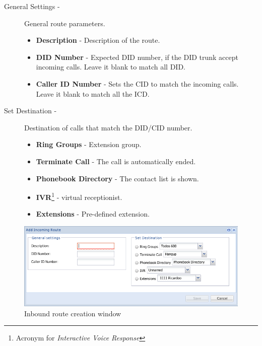 \begin{description}
            \item[General Settings -] General route parameters.
                \begin{itemize}
                    \item \textbf{Description} - Description of the route.
                    \item \textbf{DID Number} - Expected DID number, if the DID trunk accept incoming calls. Leave it blank to match all DID.
                    \item \textbf{Caller ID Number} - Sets the CID to match the incoming calls. Leave it blank to match all the ICD.
                \end{itemize}

            \item[Set Destination -] Destination of calls that match the DID/CID number.
                \begin{itemize}
                    \item \textbf{Ring Groups} - Extension group.
                    \item \textbf{Terminate Call} - The call is automatically ended.
                    \item \textbf{Phonebook Directory} - The contact list is shown.
                    \item \textbf{IVR}\footnote{Acronym for \emph{Interactive Voice Response}} - virtual receptionist.
                    \item \textbf{Extensions} - Pre-defined extension.
                \end{itemize}
       
\end{description}

\begin{figure}[H]
        \begin{center}
        \includegraphics[scale=0.6]{screenshots/etvoip_pbx_inbound_routes_add.png}
        \caption{Inbound route creation window}
        \label{fig:etvoip_pbx_inbound_routes_add}
        \end{center}
\end{figure}

